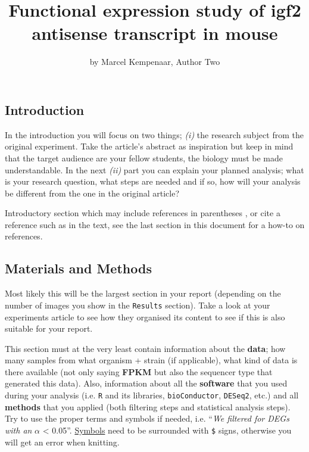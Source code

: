 \title{Functional expression study of igf2 antisense transcript in mouse}
\author{by Marcel Kempenaar, Author Two}

\maketitle


\subsection{Introduction}\label{introduction}

In the introduction you will focus on two things; \emph{(i)} the
research subject from the original experiment. Take the article's
abstract as inspiration but keep in mind that the target audience are
your fellow students, the biology must be made understandable. In the
next \emph{(ii)} part you can explain your planned analysis; what is
your research question, what steps are needed and if so, how will your
analysis be different from the one in the original article?

Introductory section which may include references in parentheses
\citep{R}, or cite a reference such as \citet{R} in the text, see the
last section in this document for a how-to on references.

\subsection{Materials and Methods}\label{materials-and-methods}

Most likely this will be the largest section in your report (depending
on the number of images you show in the \texttt{Results} section). Take
a look at your experiments article to see how they organised its content
to see if this is also suitable for your report.

This section must at the very least contain information about the
\textbf{data}; how many samples from what organism + strain (if
applicable), what kind of data is there available (not only saying
\textbf{FPKM} but also the sequencer type that generated this data).
Also, information about all the \textbf{software} that you used during
your analysis (i.e. \texttt{R} and its libraries, \texttt{bioConductor},
\texttt{DESeq2}, etc.) and all \textbf{methods} that you applied (both
filtering steps and statistical analysis steps). Try to use the proper
terms and symbols if needed, i.e. ``\emph{We filtered for DEGs with an}
\(\alpha\) \textless{} 0.05''.
\href{https://www.artofproblemsolving.com/wiki/index.php/LaTeX:Symbols}{Symbols}
need to be surrounded with \texttt{\$} signs, otherwise you will get an
error when knitting.

